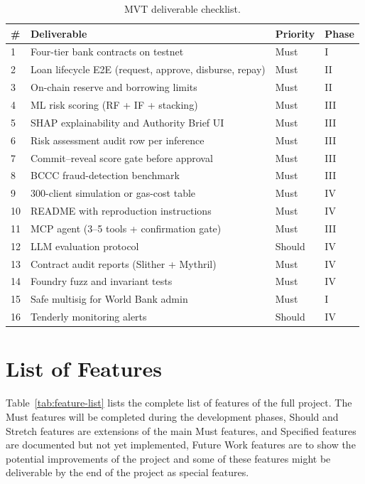 \documentclass[12pt,a4paper]{report}
\newcommand{\tableheadcolor}{\rowcolor{TableHeadBg}}
\begin{document}
\begin{table}[H]
\centering
\caption[MVT deliverable checklist]{MVT deliverable checklist.}
\label{tab:contributions-vs-future}
\label{tab:mvt-checklist}
\small
\begin{tabular}{p{0.5cm}p{9.2cm}p{1.8cm}p{1.8cm}}
\toprule
\tableheadcolor
\textbf{\#} & \textbf{Deliverable} & \textbf{Priority} & \textbf{Phase} \\
\midrule
1 & Four-tier bank contracts on testnet & Must & I \\
2 & Loan lifecycle E2E (request, approve, disburse, repay) & Must & II \\
3 & On-chain reserve and borrowing limits & Must & II \\
4 & ML risk scoring (RF + IF + stacking) & Must & III \\
5 & SHAP explainability and Authority Brief UI & Must & III \\
6 & Risk assessment audit row per inference & Must & III \\
7 & Commit--reveal score gate before approval & Must & III \\
8 & BCCC fraud-detection benchmark & Must & III \\
9 & 300-client simulation or gas-cost table & Must & IV \\
10 & README with reproduction instructions & Must & IV \\
11 & MCP agent (3--5 tools + confirmation gate) & Must & III \\
12 & LLM evaluation protocol & Should & IV \\
13 & Contract audit reports (Slither + Mythril) & Must & IV \\
14 & Foundry fuzz and invariant tests & Must & IV \\
15 & Safe multisig for World Bank admin & Must & I \\
16 & Tenderly monitoring alerts & Should & IV \\
\bottomrule
\end{tabular}
\end{table}

\section{List of Features}
\label{sec:feature-list}

Table~\ref{tab:feature-list} lists the complete list of features of the full project. The Must features will be completed during the development phases, Should and Stretch features are extensions of the main Must features, and Specified features are documented but not yet implemented, Future Work features are to show the potential improvements of the project and some of these features might be deliverable by the end of the project as special features.
\end{document}
